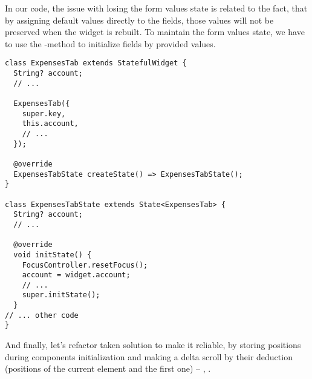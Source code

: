 In our code, the issue with losing the form values state is related to the fact, that by assigning default values 
directly to the fields, those values will not be preserved when the widget is rebuilt. To maintain the form values 
state, we have to use the -method to initialize fields by provided values.

\begin{lstlisting}
class ExpensesTab extends StatefulWidget {
  String? account;
  // ...

  ExpensesTab({
    super.key,
    this.account,
    // ...
  });

  @override
  ExpensesTabState createState() => ExpensesTabState();
}

class ExpensesTabState extends State<ExpensesTab> {
  String? account;
  // ...

  @override
  void initState() {
    FocusController.resetFocus();
    account = widget.account;
    // ...
    super.initState();
  }
// ... other code
}
\end{lstlisting}

And finally, let's refactor taken solution to make it reliable, by storing positions during components initialization
and making a delta scroll by their deduction (positions of the current element and the first one) -- , 
.
